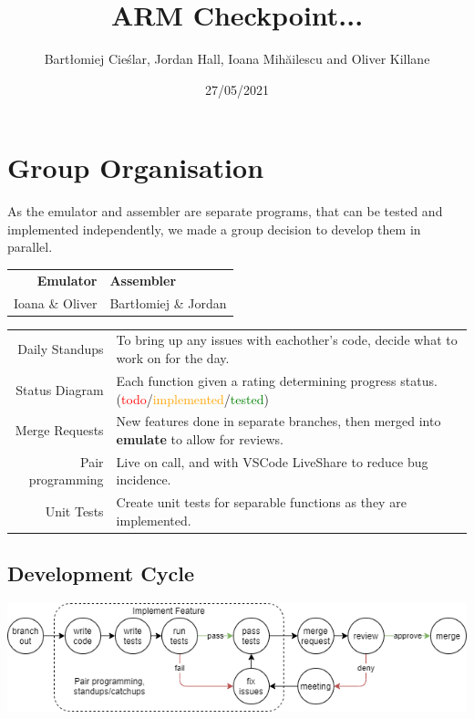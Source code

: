 \documentclass[11pt]{article}
\begin{document}
\title{ARM Checkpoint... }
\author{Bartłomiej Cieślar, Jordan Hall, Ioana Mihăilescu and Oliver Killane}
\date{27/05/2021}

\maketitle

\section{Group Organisation}
    As the emulator and assembler are separate programs, that can be tested and implemented independently, we made a group decision to develop them in parallel.
    \begin{center}
        \begin{tabular}{ r | l }
            \textbf{Emulator} & \textbf{Assembler} \\
            Ioana \& Oliver & Bartłomiej \& Jordan \\
        \end{tabular}
    \end{center}
    \begin{center}
        \begin{tabular}{r l}
            Daily Standups & To bring up any issues with eachother's code, decide what to work on for the day. \\
            Status Diagram & Each function given a rating determining progress status. (\textcolor{red}{todo}/\textcolor{orange}{implemented}/\textcolor{green}{tested}) \\
            Merge Requests & New features done in separate branches, then merged into \textbf{emulate} to allow for reviews. \\
            Pair programming & Live on call, and with VSCode LiveShare to reduce bug incidence. \\
            Unit Tests & Create unit tests for separable functions as they are implemented. \\
        \end{tabular}
    \end{center}
    \subsection*{Development Cycle}
        \begin{center}
            \includegraphics[scale=0.7]{development cycle}
        \end{center}
\end{document}
